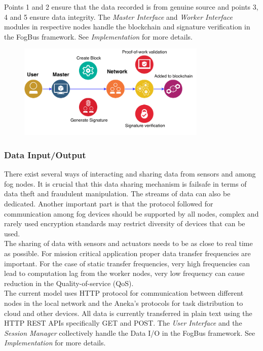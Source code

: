 \documentclass[10pt,journal,compsoc]{IEEEtran}
\begin{document}
Points 1 and 2 ensure that the data recorded is from genuine source and points 3, 4 and 5 ensure data integrity. The \textit{Master Interface} and \textit{Worker Interface} modules in respective nodes handle the blockchain and signature verification in the FogBus framework. See \textit{Implementation} for more details.
\begin{figure}[h]
\centering
\includegraphics[width=9cm]{blockchain}
\end{figure}

\subsubsection{Data Input/Output}
There exist several ways of interacting and sharing data from sensors and among fog nodes. It is crucial that this data sharing mechanism is failsafe in terms of data theft and fraudulent manipulation. The streams of data can also be dedicated. Another important part is that the protocol followed for communication among fog devices should be supported by all nodes, complex and rarely used encryption standards may restrict diversity of devices that can be used. \\
The sharing of data with sensors and actuators needs to be as close to real time as possible. For mission critical application proper data transfer frequencies are important. For the case of static transfer frequencies, very high frequencies can lead to computation lag from the worker nodes, very low frequency can cause reduction in the Quality-of-service (QoS). \\
The current model uses HTTP protocol for communication between different nodes in the local network and the Aneka’s protocols for task distribution to cloud and other devices. All data is currently transferred in plain text using the HTTP REST APIs specifically GET and POST. The \textit{User Interface} and the \textit{Session Manager} collectively handle the Data I/O in the FogBus framework. See \textit{Implementation} for more details.
\end{document}
